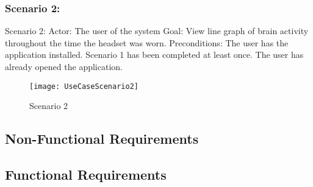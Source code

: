 \subsubsection{Scenario 2:}\label{ssec:scenar2}
Scenario 2:
Actor: The user of the system
Goal: View line graph of  brain activity throughout the time the headset was worn.
Preconditions:
The user has the application installed.
Scenario 1 has been completed at least once.
The user has already opened the application.
\begin{figure}[H]
  \centering
  \texttt{[image: UseCaseScenario2]}
  \caption{Scenario 2}\label{img:usecasescenario2}
\end{figure}

\subsection{Non-Functional Requirements}\label{ssec:non-functional-requirements}

\renewcommand*{\arraystretch}{1.4}
\begin{requirements}




\end{requirements}

\subsection{Functional Requirements}\label{ssec:functional-requirements}

